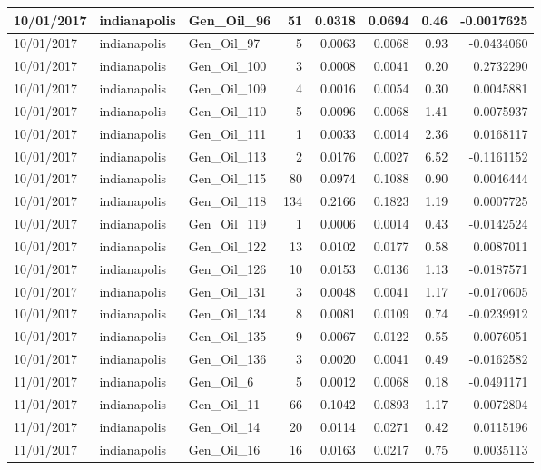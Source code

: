\documentclass[
  letterpaper,
  DIV=11,
  numbers=noendperiod]{scrartcl}
\begin{document}
\begin{tabular}{l|l|l|r|r|r|r|r}
\hline
10/01/2017 & indianapolis & Gen\_Oil\_96 & 51 & 0.0318 & 0.0694 & 0.46 & -0.0017625\\
\hline
10/01/2017 & indianapolis & Gen\_Oil\_97 & 5 & 0.0063 & 0.0068 & 0.93 & -0.0434060\\
\hline
10/01/2017 & indianapolis & Gen\_Oil\_100 & 3 & 0.0008 & 0.0041 & 0.20 & 0.2732290\\
\hline
10/01/2017 & indianapolis & Gen\_Oil\_109 & 4 & 0.0016 & 0.0054 & 0.30 & 0.0045881\\
\hline
10/01/2017 & indianapolis & Gen\_Oil\_110 & 5 & 0.0096 & 0.0068 & 1.41 & -0.0075937\\
\hline
10/01/2017 & indianapolis & Gen\_Oil\_111 & 1 & 0.0033 & 0.0014 & 2.36 & 0.0168117\\
\hline
10/01/2017 & indianapolis & Gen\_Oil\_113 & 2 & 0.0176 & 0.0027 & 6.52 & -0.1161152\\
\hline
10/01/2017 & indianapolis & Gen\_Oil\_115 & 80 & 0.0974 & 0.1088 & 0.90 & 0.0046444\\
\hline
10/01/2017 & indianapolis & Gen\_Oil\_118 & 134 & 0.2166 & 0.1823 & 1.19 & 0.0007725\\
\hline
10/01/2017 & indianapolis & Gen\_Oil\_119 & 1 & 0.0006 & 0.0014 & 0.43 & -0.0142524\\
\hline
10/01/2017 & indianapolis & Gen\_Oil\_122 & 13 & 0.0102 & 0.0177 & 0.58 & 0.0087011\\
\hline
10/01/2017 & indianapolis & Gen\_Oil\_126 & 10 & 0.0153 & 0.0136 & 1.13 & -0.0187571\\
\hline
10/01/2017 & indianapolis & Gen\_Oil\_131 & 3 & 0.0048 & 0.0041 & 1.17 & -0.0170605\\
\hline
10/01/2017 & indianapolis & Gen\_Oil\_134 & 8 & 0.0081 & 0.0109 & 0.74 & -0.0239912\\
\hline
10/01/2017 & indianapolis & Gen\_Oil\_135 & 9 & 0.0067 & 0.0122 & 0.55 & -0.0076051\\
\hline
10/01/2017 & indianapolis & Gen\_Oil\_136 & 3 & 0.0020 & 0.0041 & 0.49 & -0.0162582\\
\hline
11/01/2017 & indianapolis & Gen\_Oil\_6 & 5 & 0.0012 & 0.0068 & 0.18 & -0.0491171\\
\hline
11/01/2017 & indianapolis & Gen\_Oil\_11 & 66 & 0.1042 & 0.0893 & 1.17 & 0.0072804\\
\hline
11/01/2017 & indianapolis & Gen\_Oil\_14 & 20 & 0.0114 & 0.0271 & 0.42 & 0.0115196\\
\hline
11/01/2017 & indianapolis & Gen\_Oil\_16 & 16 & 0.0163 & 0.0217 & 0.75 & 0.0035113\\

\end{tabular}
\end{document}
